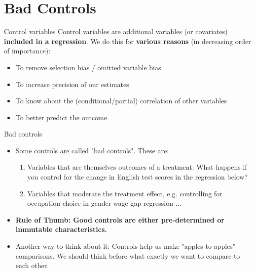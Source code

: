 \documentclass[11pt]{beamer}
\begin{document}
\section{Bad Controls}


\begin{frame}{Control variables}
Control variables are additional variables (or covariates) \textbf{included in a regression}. We do this for \textbf{various reasons} (in decreasing order of importance):
\begin{itemize}
    \item To remove selection bias / omitted variable bias
    \item To increase precision of our estimates
    \item To know about the (conditional/partial) correlation of other variables
    \item To better predict the outcome
\end{itemize}

\end{frame}





\begin{frame}{Bad controls}
    \begin{itemize}

        \item Some controls are called "bad controls". These are:
        \begin{enumerate}
            \item Variables that are themselves outcomes of a treatment: What happens if you control for the change in English test scores in the regression below? 


    \item Variables that moderate the treatment effect, e.g. controlling for occupation choice in gender wage gap regression $\dots$

    \end{enumerate}
    \item \textbf{\color{TolLightBlue} Rule of Thumb: Good controls are either pre-determined or immutable characteristics.}
    \item Another way to think about it: Controls help us make "apples to apples" comparisons. We should think before what exactly we want to compare to each other.
    \end{itemize}
\end{frame}
\end{document}
